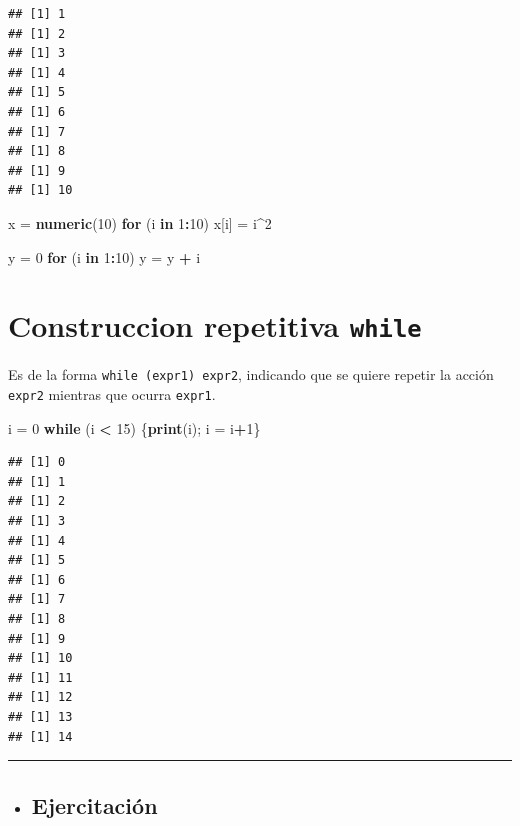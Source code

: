 \documentclass[]{book}
\newenvironment{Shaded}{\begin{snugshade}}{\end{snugshade}}
\newcommand{\KeywordTok}[1]{\textcolor[rgb]{0.13,0.29,0.53}{\textbf{#1}}}
\newcommand{\DecValTok}[1]{\textcolor[rgb]{0.00,0.00,0.81}{#1}}
\newcommand{\StringTok}[1]{\textcolor[rgb]{0.31,0.60,0.02}{#1}}
\newcommand{\ControlFlowTok}[1]{\textcolor[rgb]{0.13,0.29,0.53}{\textbf{#1}}}
\newcommand{\OperatorTok}[1]{\textcolor[rgb]{0.81,0.36,0.00}{\textbf{#1}}}
\newcommand{\NormalTok}[1]{#1}
\newenvironment{rmdblock}[1]
{\begin{shaded*}
		\begin{itemize}
			\renewcommand{\labelitemi}{
				\raisebox{-.7\height}[0pt][0pt]{
					{\setkeys{Gin}{width=3em,keepaspectratio}\texttt{[image: images/\#1]}}
				}
			}
			\item
		}
		{
		\end{itemize}
	\end{shaded*}
}
\newenvironment{rmdtip}
{\begin{rmdblock}{tip}}
	{\end{rmdblock}}
\begin{document}
\begin{verbatim}
## [1] 1
## [1] 2
## [1] 3
## [1] 4
## [1] 5
## [1] 6
## [1] 7
## [1] 8
## [1] 9
## [1] 10
\end{verbatim}

\begin{Shaded}
\begin{Highlighting}[]
\NormalTok{x =}\StringTok{ }\KeywordTok{numeric}\NormalTok{(}\DecValTok{10}\NormalTok{)}
\ControlFlowTok{for}\NormalTok{ (i }\ControlFlowTok{in} \DecValTok{1}\OperatorTok{:}\DecValTok{10}\NormalTok{) x[i] =}\StringTok{ }\NormalTok{i}\OperatorTok{^}\DecValTok{2}

\NormalTok{y =}\StringTok{ }\DecValTok{0}
\ControlFlowTok{for}\NormalTok{ (i }\ControlFlowTok{in} \DecValTok{1}\OperatorTok{:}\DecValTok{10}\NormalTok{) y =}\StringTok{ }\NormalTok{y }\OperatorTok{+}\StringTok{ }\NormalTok{i}
\end{Highlighting}
\end{Shaded}

\section{\texorpdfstring{Construccion repetitiva
\texttt{while}}{Construccion repetitiva while}}\label{construccion-repetitiva-while}

Es de la forma \texttt{while\ (expr1)\ expr2}, indicando que se quiere
repetir la acción \texttt{expr2} mientras que ocurra \texttt{expr1}.

\begin{Shaded}
\begin{Highlighting}[]
\NormalTok{i =}\StringTok{ }\DecValTok{0}
\ControlFlowTok{while}\NormalTok{ (i }\OperatorTok{<}\StringTok{ }\DecValTok{15}\NormalTok{) \{}\KeywordTok{print}\NormalTok{(i); i =}\StringTok{ }\NormalTok{i}\OperatorTok{+}\DecValTok{1}\NormalTok{\}}
\end{Highlighting}
\end{Shaded}

\begin{verbatim}
## [1] 0
## [1] 1
## [1] 2
## [1] 3
## [1] 4
## [1] 5
## [1] 6
## [1] 7
## [1] 8
## [1] 9
## [1] 10
## [1] 11
## [1] 12
## [1] 13
## [1] 14
\end{verbatim}

\begin{center}\rule{0.5\linewidth}{\linethickness}\end{center}

\begin{rmdtip}
\subsection{Ejercitación}\label{ejercitacion}
\end{rmdtip}
\end{document}
